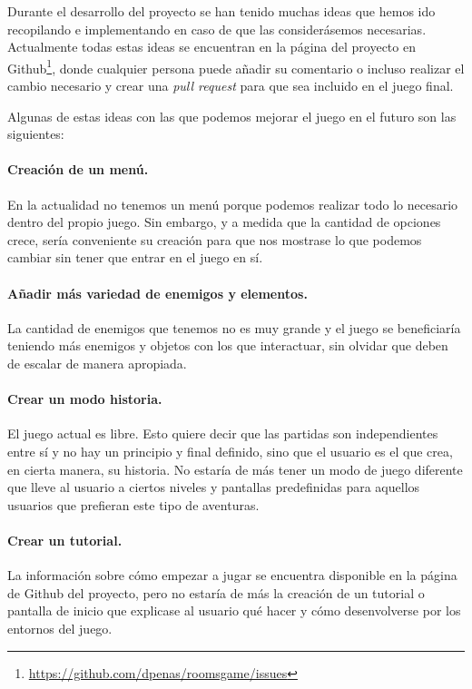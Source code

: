 Durante el desarrollo del proyecto se han tenido muchas ideas que hemos ido recopilando e implementando en caso de que las considerásemos necesarias. Actualmente todas estas ideas se encuentran en la página del proyecto en Github\footnote{\url{https://github.com/dpenas/roomsgame/issues}}, donde cualquier persona puede añadir su comentario o incluso realizar el cambio necesario y crear una \textit{pull request} para que sea incluido en el juego final.

Algunas de estas ideas con las que podemos mejorar el juego en el futuro son las siguientes: 

\paragraph{Creación de un menú.} En la actualidad no tenemos un menú porque podemos realizar todo lo necesario dentro del propio juego. Sin embargo, y a medida que la cantidad de opciones crece, sería conveniente su creación para que nos mostrase lo que podemos cambiar sin tener que entrar en el juego en sí.

\paragraph{Añadir más variedad de enemigos y elementos.} La cantidad de enemigos que tenemos no es muy grande y el juego se beneficiaría teniendo más enemigos y objetos con los que interactuar, sin olvidar que deben de escalar de manera apropiada.

\paragraph{Crear un modo historia.} El juego actual es libre. Esto quiere decir que las partidas son independientes entre sí y no hay un principio y final definido, sino que el usuario es el que crea, en cierta manera, su historia. 
No estaría de más tener un modo de juego diferente que lleve al usuario a ciertos niveles y pantallas predefinidas para aquellos usuarios que prefieran este tipo de aventuras.

\paragraph{Crear un tutorial.} La información sobre cómo empezar a jugar se encuentra disponible en la página de Github del proyecto, pero no estaría de más la creación de un tutorial o pantalla de inicio que explicase al usuario qué hacer y cómo desenvolverse por los entornos del juego.

